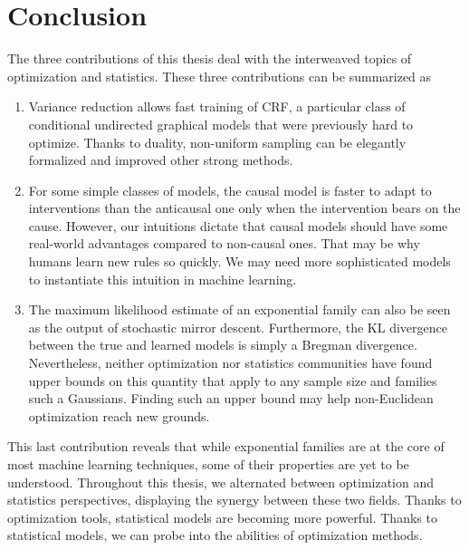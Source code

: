 \chapter{Conclusion}
\label{chap:discussion}

The three contributions of this thesis deal with the interweaved topics of optimization and statistics. 
These three contributions can be summarized as 
\begin{enumerate}
	\item Variance reduction allows fast training of CRF, a particular class of conditional undirected graphical models that were previously hard to optimize. Thanks to duality, non-uniform sampling can be elegantly formalized and improved other strong methods.
	\item For some simple classes of models, the causal model is faster to adapt to interventions than the anticausal one only when the intervention bears on the cause. 
	However, our intuitions dictate that causal models should have some real-world advantages compared to non-causal ones. 
	That may be why humans learn new rules so quickly.
	We may need more sophisticated models to instantiate this intuition in machine learning.
	\item The maximum likelihood estimate of an exponential family can also be seen as the output of stochastic mirror descent. Furthermore, the KL divergence between the true and learned models is simply a Bregman divergence. Nevertheless, neither optimization nor statistics communities have found upper bounds on this quantity that apply to any sample size and families such a Gaussians. 
	Finding such an upper bound may help non-Euclidean optimization reach new grounds.
\end{enumerate}
This last contribution reveals that while exponential families are at the core of most machine learning techniques, some of their properties are yet to be understood.
Throughout this thesis, we alternated between optimization and statistics perspectives, displaying the synergy between these two fields. Thanks to optimization tools, statistical models are becoming more powerful. Thanks to statistical models, we can probe into the abilities of optimization methods.


